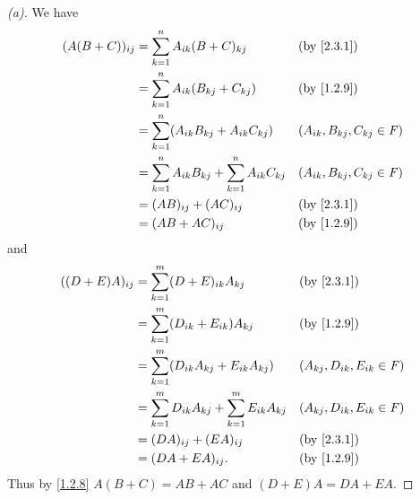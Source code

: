 \begin{proof}[(a)]
	We have
	\begin{align*}
		(A (B + C))_{i j} & = \sum_{k = 1}^n A_{i k} (B + C)_{k j}                            &  & \by{2.3.1}                         \\
		                  & = \sum_{k = 1}^n A_{i k} (B_{k j} + C_{k j})                      &  & \by{1.2.9}                         \\
		                  & = \sum_{k = 1}^n (A_{i k} B_{k j} + A_{i k} C_{k j})              &  & (A_{i k}, B_{k j}, C_{k j} \in \F) \\
		                  & = \sum_{k = 1}^n A_{i k} B_{k j} + \sum_{k = 1}^n A_{i k} C_{k j} &  & (A_{i k}, B_{k j}, C_{k j} \in \F) \\
		                  & = (AB)_{i j} + (AC)_{i j}                                         &  & \by{2.3.1}                         \\
		                  & = (AB + AC)_{i j}                                                 &  & \by{1.2.9}
	\end{align*}
	and
	\begin{align*}
		((D + E) A)_{i j} & = \sum_{k = 1}^m (D + E)_{i k} A_{k j}                            &  & \by{2.3.1}                         \\
		                  & = \sum_{k = 1}^m (D_{i k} + E_{i k}) A_{k j}                      &  & \by{1.2.9}                         \\
		                  & = \sum_{k = 1}^m (D_{i k} A_{k j} + E_{i k} A_{k j})              &  & (A_{k j}, D_{i k}, E_{i k} \in \F) \\
		                  & = \sum_{k = 1}^m D_{i k} A_{k j} + \sum_{k = 1}^m E_{i k} A_{k j} &  & (A_{k j}, D_{i k}, E_{i k} \in \F) \\
		                  & = (DA)_{i j} + (EA)_{i j}                                         &  & \by{2.3.1}                         \\
		                  & = (DA + EA)_{i j}.                                                &  & \by{1.2.9}
	\end{align*}
	Thus by \cref{1.2.8} \(A (B + C) = AB + AC\) and \((D + E) A = DA + EA\).
\end{proof}

